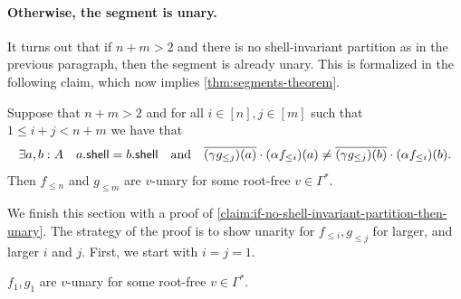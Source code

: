 \paragraph{Otherwise, the segment is unary.} It turns out that if $n + m > 2$ and there is no shell-invariant partition as in the previous paragraph, then the segment is already unary. This is formalized in the following claim, which now implies \cref{thm:segments-theorem}.

\begin{claim}\label{claim:if-no-shell-invariant-partition-then-unary}
    Suppose that $n + m > 2$ and for all $i \in [n], j \in [m]$ such that $1 \leq i + j < n + m$ we have that
    \[
        \exists a, b : A \quad a . \mathsf{shell} = b . \mathsf{shell} \quad \text{and} \quad \overline{(\gamma g_{\leq j})(a)} \cdot (\alpha f_{\leq i})(a) \neq \overline{(\gamma g_{\leq j})(b)} \cdot (\alpha f_{\leq i})(b).
    \]
    Then $f_{\leq n}$ and $g_{\leq m}$ are $v$-unary for some root-free $v \in \Gamma^*$.
\end{claim}

We finish this section with a proof of \cref{claim:if-no-shell-invariant-partition-then-unary}. The strategy of the proof is to show unarity for $f_{\leq i}, g_{\leq j}$ for larger, and larger $i$ and $j$. First, we start with $i = j = 1$.

\begin{claim}
    $f_1, g_1$ are $v$-unary for some root-free $v \in \Gamma^*$.
\end{claim}

